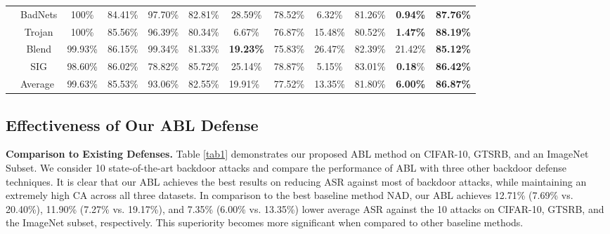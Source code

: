 \begin{table}[!htp]
\begin{tabular}{c|c|cc|cc|cc|cc|cc}
& BadNets & 100\% & 84.41\% & 97.70\% & 82.81\% & 28.59\% & 78.52\% & 6.32\% & 81.26\% & \textbf{0.94\%} & \textbf{87.76\%} \\
 & Trojan & 100\% & 85.56\% & 96.39\% & 80.34\% & 6.67\% & 76.87\% & 15.48\% & 80.52\% & \textbf{1.47\%} & \textbf{88.19\%} \\
 & Blend & 99.93\% & 86.15\% & 99.34\% & 81.33\% & \textbf{19.23\%} & 75.83\% & 26.47\% & 82.39\% & 21.42\% & \textbf{85.12\%} \\ 
 & SIG & 98.60\% & 86.02\% & 78.82\% & 85.72\% & 25.14\% & 78.87\% & 5.15\% & 83.01\% & \textbf{0.18}\% & \textbf{86.42\%} \\ \cline{2-12} 
 & \multicolumn{1}{l}{Average} & \multicolumn{1}{|l}{99.63\%} & \multicolumn{1}{l}{85.53\%} & \multicolumn{1}{|l}{93.06\%} & \multicolumn{1}{l}{82.55\%} & \multicolumn{1}{|l}{19.91\%} & \multicolumn{1}{l}{77.52\%} & \multicolumn{1}{|l}{13.35\%} & \multicolumn{1}{l}{81.80\%} & \multicolumn{1}{|c}{\textbf{6.00\%}} & \multicolumn{1}{c}{\textbf{86.87\%}} \\
 \bottomrule
\end{tabular}
\vspace{-0.1in}
\end{table}

\subsection{Effectiveness of Our ABL Defense}\label{sec:4.1}

\noindent\textbf{Comparison to Existing Defenses.} Table \ref{tab1} demonstrates our proposed ABL method on CIFAR-10, GTSRB, and an ImageNet Subset. We consider 10 state-of-the-art backdoor attacks and compare the performance of ABL with three other backdoor defense techniques. It is clear that our ABL achieves the best results on reducing ASR against most of backdoor attacks, while maintaining an extremely high CA across all three datasets.
In comparison to the best baseline method NAD, our ABL achieves 12.71\% (7.69\% vs. 20.40\%), 11.90\% (7.27\% vs. 19.17\%), and 7.35\% (6.00\% vs. 13.35\%) lower average ASR against the 10 attacks on CIFAR-10, GTSRB, and the ImageNet subset, respectively. This superiority becomes more significant when compared to other baseline methods. 

